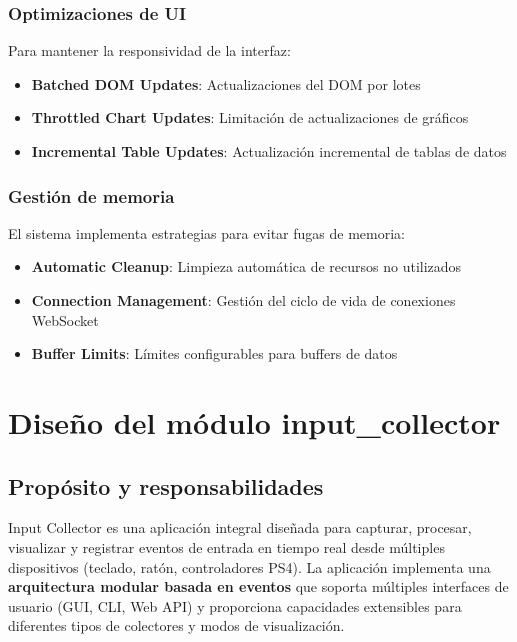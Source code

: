 \subsubsection{Optimizaciones de UI}

Para mantener la responsividad de la interfaz:
\begin{itemize}
    \item \textbf{Batched DOM Updates}: Actualizaciones del DOM por lotes
    \item \textbf{Throttled Chart Updates}: Limitación de actualizaciones de gráficos
    \item \textbf{Incremental Table Updates}: Actualización incremental de tablas de datos
\end{itemize}

\subsubsection{Gestión de memoria}

El sistema implementa estrategias para evitar fugas de memoria:
\begin{itemize}
    \item \textbf{Automatic Cleanup}: Limpieza automática de recursos no utilizados
    \item \textbf{Connection Management}: Gestión del ciclo de vida de conexiones WebSocket
    \item \textbf{Buffer Limits}: Límites configurables para buffers de datos
\end{itemize}

\section{Diseño del módulo input\_collector}
\label{sec:diseno_input_collector}

\subsection{Propósito y responsabilidades}
\label{subsec:proposito_input_collector}

Input Collector es una aplicación integral diseñada para capturar, procesar, visualizar y registrar eventos de entrada en tiempo real desde múltiples dispositivos (teclado, ratón, controladores PS4). La aplicación implementa una \textbf{arquitectura modular basada en eventos} que soporta múltiples interfaces de usuario (GUI, CLI, Web API) y proporciona capacidades extensibles para diferentes tipos de colectores y modos de visualización.

